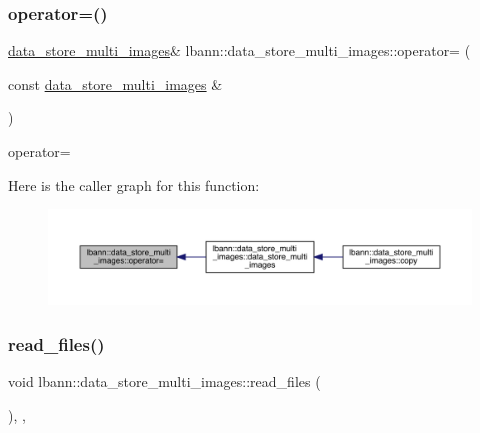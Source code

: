 \subsubsection{\texorpdfstring{operator=()}{operator=()}}
{\footnotesize\ttfamily \hyperlink{classlbann_1_1data__store__multi__images}{data\+\_\+store\+\_\+multi\+\_\+images}\& lbann\+::data\+\_\+store\+\_\+multi\+\_\+images\+::operator= (\begin{DoxyParamCaption}\item[{const \hyperlink{classlbann_1_1data__store__multi__images}{data\+\_\+store\+\_\+multi\+\_\+images} \&}]{ }\end{DoxyParamCaption})\hspace{0.3cm}{\ttfamily [default]}}



operator= 

Here is the caller graph for this function\+:\nopagebreak
\begin{figure}[H]
\begin{center}
\leavevmode
\includegraphics[width=350pt]{classlbann_1_1data__store__multi__images_a68962dc0416b572443953bea392439b1_icgraph}
\end{center}
\end{figure}
\mbox{\label{classlbann_1_1data__store__multi__images_a8ce8ccf3c7b0d19adfb838108bec075b}} 
\subsubsection{\texorpdfstring{read\+\_\+files()}{read\_files()}}
{\footnotesize\ttfamily void lbann\+::data\+\_\+store\+\_\+multi\+\_\+images\+::read\+\_\+files (\begin{DoxyParamCaption}{ }\end{DoxyParamCaption})\hspace{0.3cm}{\ttfamily [override]}, {\ttfamily [protected]}, {\ttfamily [virtual]}}



